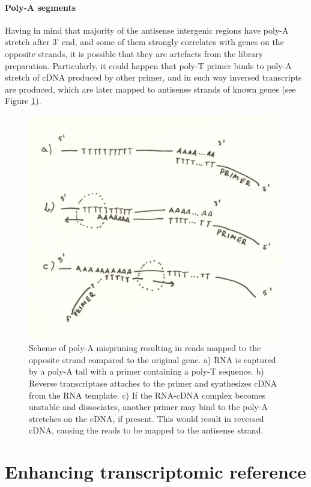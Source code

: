 \paragraph{Poly-A segments}

Having in mind that majority of the antisense intergenic regions have poly-A stretch after 3' end,
and some of them strongly correlates with genes on the opposite strands,
it is possible that they are artefacts from the library preparation.
Particularly, it could happen that poly-T primer binds to poly-A stretch of cDNA produced by other primer,
and in such way inversed transcripts are produced,
which are later mapped to antisense strands of known genes (see Figure \ref{fig:mispriming}).


\begin{figure}
  \centering
  \includegraphics[width=0.7\linewidth]{images/mispriming.jpg}
  \caption{Scheme of poly-A mispriming resulting in reads mapped to the opposite strand compared to the original gene.
  a) RNA is captured by a poly-A tail with a primer containing a poly-T sequence.
  b) Reverse transcriptase attaches to the primer and synthesizes cDNA from the RNA template.
  c) If the RNA-cDNA complex becomes unstable and dissociates, another primer may bind to the poly-A stretches on the cDNA,
  if present. This would result in reversed cDNA, causing the reads to be mapped to the antisense strand.}
  \label{fig:mispriming}
\end{figure}




\iffalse

\section{Enhancing transcriptomic reference}

